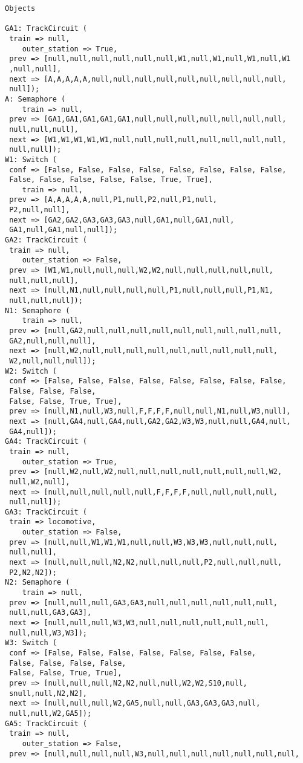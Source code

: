\begin{lstlisting}[caption={oggetti istanziati nella simulazione}]
Objects

GA1: TrackCircuit (
 train => null, 
    outer_station => True,
 prev => [null,null,null,null,null,null,W1,null,W1,null,W1,null,W1
 ,null,null],
 next => [A,A,A,A,A,null,null,null,null,null,null,null,null,null,
 null]);
A: Semaphore (
    train => null,
 prev => [GA1,GA1,GA1,GA1,GA1,null,null,null,null,null,null,null,
 null,null,null],
 next => [W1,W1,W1,W1,W1,null,null,null,null,null,null,null,null,
 null,null]);
W1: Switch (
 conf => [False, False, False, False, False, False, False, False, 
 False, False, False, False, False, True, True],
    train => null,
 prev => [A,A,A,A,A,null,P1,null,P2,null,P1,null,
 P2,null,null],
 next => [GA2,GA2,GA3,GA3,GA3,null,GA1,null,GA1,null,
 GA1,null,GA1,null,null]);
GA2: TrackCircuit (
 train => null, 
    outer_station => False,
 prev => [W1,W1,null,null,null,W2,W2,null,null,null,null,null,
 null,null,null],
 next => [null,N1,null,null,null,null,P1,null,null,null,P1,N1,
 null,null,null]);
N1: Semaphore (
    train => null,
 prev => [null,GA2,null,null,null,null,null,null,null,null,null,
 GA2,null,null,null],
 next => [null,W2,null,null,null,null,null,null,null,null,null,
 W2,null,null,null]);
W2: Switch (
 conf => [False, False, False, False, False, False, False, False, 
 False, False, False, 
 False, False, True, True],
 prev => [null,N1,null,W3,null,F,F,F,F,null,null,N1,null,W3,null],
 next => [null,GA4,null,GA4,null,GA2,GA2,W3,W3,null,null,GA4,null,
 GA4,null]);
GA4: TrackCircuit (
 train => null, 
    outer_station => True,
 prev => [null,W2,null,W2,null,null,null,null,null,null,null,W2,
 null,W2,null],
 next => [null,null,null,null,null,F,F,F,F,null,null,null,null,
 null,null]);
GA3: TrackCircuit (
 train => locomotive, 
    outer_station => False,
 prev => [null,null,W1,W1,W1,null,null,W3,W3,W3,null,null,null,
 null,null],
 next => [null,null,null,N2,N2,null,null,null,P2,null,null,null,
 P2,N2,N2]);
N2: Semaphore (
    train => null,
 prev => [null,null,null,GA3,GA3,null,null,null,null,null,null,
 null,null,GA3,GA3],
 next => [null,null,null,W3,W3,null,null,null,null,null,null,
 null,null,W3,W3]);
W3: Switch (
 conf => [False, False, False, False, False, False, False, 
 False, False, False, False, 
 False, False, True, True],
 prev => [null,null,null,N2,N2,null,null,W2,W2,S10,null,
 snull,null,N2,N2],
 next => [null,null,null,W2,GA5,null,null,GA3,GA3,GA3,null,
 null,null,W2,GA5]);
GA5: TrackCircuit (
 train => null, 
    outer_station => False,
 prev => [null,null,null,null,W3,null,null,null,null,null,null,null,

\end{lstlisting}

